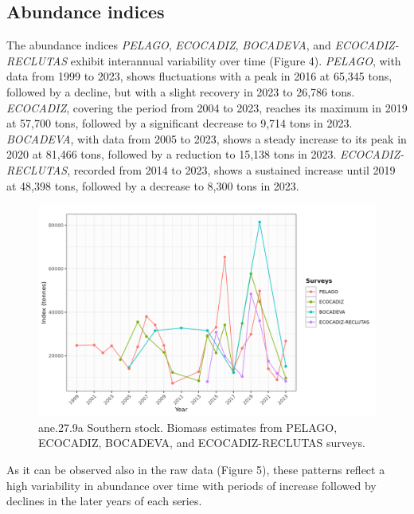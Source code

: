 \documentclass[
]{article}
\begin{document}
\hypertarget{abundance-indices}{%
\subsection{Abundance indices}\label{abundance-indices}}

The abundance indices \emph{PELAGO}, \emph{ECOCADIZ}, \emph{BOCADEVA},
and \emph{ECOCADIZ-RECLUTAS} exhibit interannual variability over time
(Figure 4). \emph{PELAGO}, with data from 1999 to 2023, shows
fluctuations with a peak in 2016 at 65,345 tons, followed by a decline,
but with a slight recovery in 2023 to 26,786 tons. \emph{ECOCADIZ},
covering the period from 2004 to 2023, reaches its maximum in 2019 at
57,700 tons, followed by a significant decrease to 9,714 tons in 2023.
\emph{BOCADEVA}, with data from 2005 to 2023, shows a steady increase to
its peak in 2020 at 81,466 tons, followed by a reduction to 15,138 tons
in 2023. \emph{ECOCADIZ-RECLUTAS}, recorded from 2014 to 2023, shows a
sustained increase until 2019 at 48,398 tons, followed by a decrease to
8,300 tons in 2023.

\begin{figure}[H]

{\centering \includegraphics[width=0.95\linewidth]{report/run/S1.0_4FLEETS_SelECO_RecIndex_Mnewfix//fig_indiceBiomass} 

}

\caption{ane.27.9a Southern stock. Biomass estimates from PELAGO, ECOCADIZ, BOCADEVA, and ECOCADIZ-RECLUTAS surveys.}\label{fig:unnamed-chunk-5}
\end{figure}

As it can be observed also in the raw data (Figure 5), these patterns
reflect a high variability in abundance over time with periods of
increase followed by declines in the later years of each series.
\end{document}
